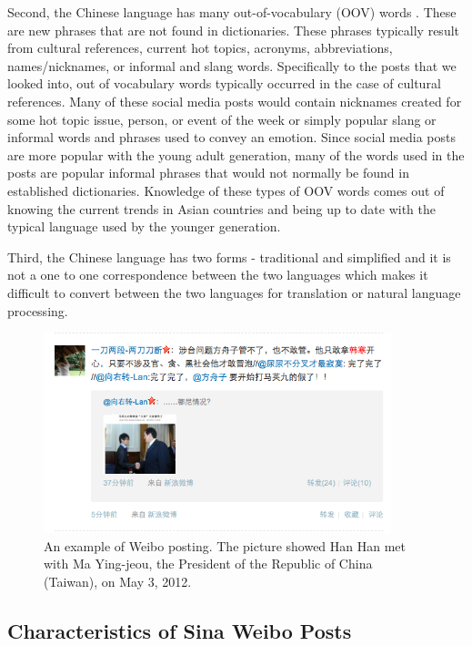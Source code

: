 \documentclass[11pt]{article}
\newcommand{\1}[1]{{\mathbf 1}\left\{#1\right\}}        %
\begin{document}
Second, the Chinese language has many out-of-vocabulary (OOV) words .  These are new phrases that are not found in dictionaries.  These phrases typically result from cultural references, current hot topics, acronyms, abbreviations, names/nicknames, or informal and slang words.  Specifically to the posts that we looked into, out of vocabulary words typically occurred in the case of cultural references.  Many of these social media posts would contain nicknames created for some hot topic issue, person, or event of the week or simply popular slang or informal words and phrases used to convey an emotion.  Since social media posts are more popular with the young adult generation, many of the words used in the posts are popular informal phrases that would not normally be found in established dictionaries. Knowledge of these types of OOV words comes out of knowing the current trends in Asian countries and being up to date with the typical language used by the younger generation.  

Third, the Chinese language has two forms - traditional and simplified and it is not a one to one correspondence between the two languages which makes it difficult to convert between the two languages for translation or natural language processing. 


\begin{center}
\begin{figure}[!h]
   \centering
   \includegraphics[width=0.9\textwidth]{./slides/weiboEg.png} 
      \caption{An example of Weibo posting. The picture showed Han Han met with Ma Ying-jeou, the President of the Republic of China (Taiwan), on May 3, 2012.}
   \label{fig:weiboex}
\end{figure}
\end{center}

\subsection{Characteristics of Sina Weibo Posts}\label{subsubsec:Weibo}
\end{document}
